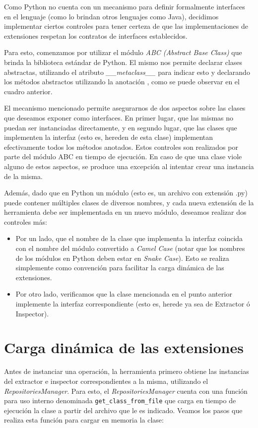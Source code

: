 Como Python no cuenta con un mecanismo para definir formalmente interfaces en el lenguaje (como lo brindan otros lenguajes como Java), decidimos implementar ciertos controles para tener certeza de que las implementaciones de extensiones respetan los contratos de interfaces establecidos.

Para esto, comenzamos por utilizar el módulo \emph{ABC (Abstract Base Class)} que brinda la biblioteca estándar de Python. El mismo nos permite declarar clases abstractas, utilizando el atributo \emph{\_\_metaclass\_\_} para indicar esto y declarando los métodos abstractos utilizando la anotación \emph{\@abstractmethod}, como se puede observar en el cuadro anterior.

El mecanismo mencionado permite asegurarnos de dos aspectos sobre las clases que deseamos exponer como interfaces. En primer lugar, que las mismas no puedan ser instanciadas directamente, y en segundo lugar, que las clases que implementen la interfaz (esto es, hereden de esta clase) implementan efectivamente todos los métodos anotados. Estos controles son realizados por parte del módulo ABC en tiempo de ejecución. En caso de que una clase viole alguno de estos aspectos, se produce una excepción al intentar crear una instancia de la misma.

Además, dado que en Python un módulo (esto es, un archivo con extensión .py) puede contener múltiples clases de diversos nombres, y cada nueva extensión de la herramienta debe ser implementada en un nuevo módulo, deseamos realizar dos controles más:

\begin{itemize}
\item Por un lado, que el nombre de la clase que implementa la interfaz coincida con el nombre del módulo convertido a \emph{Camel Case} (notar que los nombres de los módulos en Python deben estar en \emph{Snake Case}). Esto se realiza simplemente como convención para facilitar la carga dinámica de las extensiones.
\item Por otro lado, verificamos que la clase mencionada en el punto anterior implemente la interfaz correspondiente (esto es, herede ya sea de Extractor ó Inspector).
\end{itemize}

\section{Carga dinámica de las extensiones}
Antes de instanciar una operación, la herramienta primero obtiene las instancias del extractor e inspector correspondientes a la misma, utilizando el \emph{RepositoriesManager}. Para esto, el \emph{RepositoriesManager} cuenta con una función para uso interno denominada \texttt{get\_class\_from\_file} que carga en tiempo de ejecución la clase a partir del archivo que le es indicado. Veamos los pasos que realiza esta función para cargar en memoria la clase:

